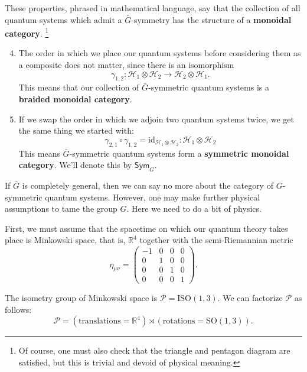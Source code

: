 \documentclass[a4paper]{report}
\newcommand{\R}{\mathbb{R}}
\theoremstyle{definition}
\theoremstyle{plain}
\theoremstyle{remark}
\begin{document}
These properties, phrased in mathematical language, say that the collection of all quantum systems which admit a $\bar{G}$-symmetry has the structure of a \textbf{monoidal category}. \footnote{Of course, one must also check that the triangle and pentagon diagram are satisfied, but this is trivial and devoid of physical meaning.} 

\begin{enumerate}
    \setcounter{enumi}{3}
  \item The order in which we place our quantum systems before considering them as a composite does not matter, since there is an isomorphism
    \begin{equation*}
      \gamma_{1,2}\colon \mathscr{H}_{1} \otimes \mathscr{H}_{2} \to \mathscr{H}_{2} \otimes \mathscr{H}_{1}.
    \end{equation*}
    This means that our collection of $\bar{G}$-symmetric quantum systems is a \textbf{braided monoidal category}.

  \item If we swap the order in which we adjoin two quantum systems twice, we get the same thing we started with:
    \begin{equation*}
      \gamma_{2,1} \circ \gamma_{1,2} = \mathrm{id}_{\mathscr{H}_{1} \otimes \mathscr{H}_{2}} \colon \mathscr{H}_{1} \otimes \mathscr{H}_{2}
    \end{equation*}
    This means $\bar{G}$-symmetric quantum systems form a \textbf{symmetric monoidal category}. We'll denote this by $\mathsf{Sym}_{G}$.
\end{enumerate}

If $\bar{G}$ is completely general, then we can say no more about the category of $G$-symmetric quantum systems. However, one may make further physical assumptions to tame the group $G$. Here we need to do a bit of physics.

First, we must assume that the spacetime on which our quantum theory takes place is Minkowski space, that is, $\R^{4}$ together with the semi-Riemannian metric
\begin{equation*}
  \eta_{\mu\nu} =
  \begin{pmatrix}
    -1 & 0 & 0 & 0 \\
    0 & 1 & 0 & 0 \\
    0 & 0 & 1 & 0 \\
    0 & 0 & 0 & 1
  \end{pmatrix}.
\end{equation*}

The isometry group of Minkowski space is $\mathcal{P} = \mathrm{ISO}(1, 3)$. We can factorize $\mathcal{P}$ as follows:
\begin{equation*}
  \mathcal{P} = \left( \text{translations} = \R^{4} \right) \rtimes \left( \text{rotations} = \mathrm{SO}(1, 3) \right).
\end{equation*}
\end{document}
